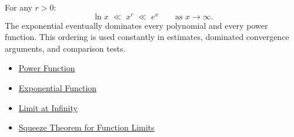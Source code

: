 \begin{remark*}
For any $r > 0$:
\[
  \ln x \;\ll\; x^r \;\ll\; e^x
  \qquad \text{as } x \to \infty.
\]
The exponential eventually dominates every polynomial and every
power function. This ordering is used constantly in estimates,
dominated convergence arguments, and comparison tests.
\end{remark*}

\begin{dependencies}
\begin{itemize}
  \item \hyperref[def:power-function]{Power Function}
  \item \hyperref[def:exponential]{Exponential Function}
  \item \hyperref[def:limit-at-infinity]{Limit at Infinity}
  \item \hyperref[thm:squeeze-function-limits]{Squeeze Theorem for Function Limits}
\end{itemize}
\end{dependencies}
